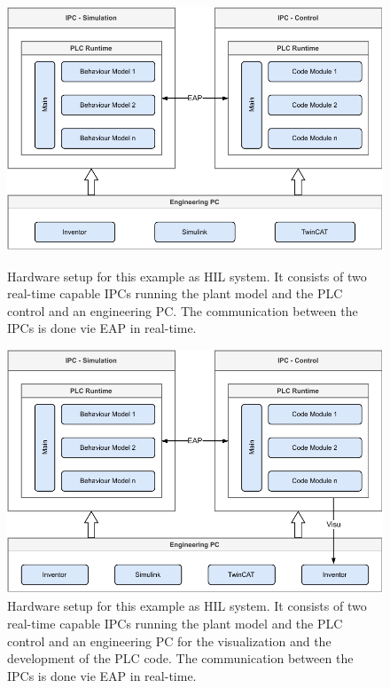     	\begin{figure}[htp]
    		\centering
\ifundef{\WithVisualization} {
    		\includegraphics[width=0.9\linewidth]{figures/ExampleSetupHardware.pdf}
    		\caption[Hardware setup for this example as HIL system.]{Hardware setup for this example as HIL system. It consists of two real-time capable IPCs running the plant model and the PLC control and an engineering PC. The communication between the IPCs is done vie EAP in real-time. }
} {
        	\includegraphics[width=0.9\linewidth]{figures/ExampleSetupHardwareVisu.pdf}
    		\caption[Hardware setup for this example as HIL system.]{Hardware setup for this example as HIL system. It consists of two real-time capable IPCs running the plant model and the PLC control and an engineering PC for the visualization and the development of the PLC code. The communication between the IPCs is done vie EAP in real-time. }
}
    		\label{fig:ExampleUsedSetup}
    	\end{figure}

        


